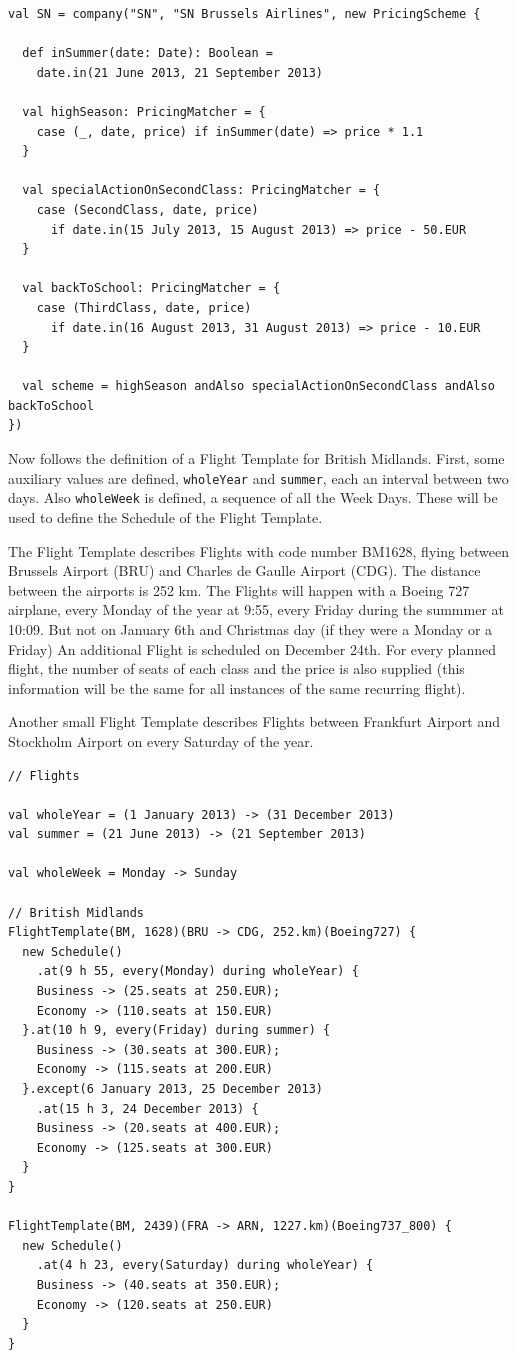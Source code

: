 \documentclass[a4paper]{article}
\renewcommand{\sc}[1]{\lstinline{#1}}
\begin{document}
\begin{lstlisting}
val SN = company("SN", "SN Brussels Airlines", new PricingScheme {

  def inSummer(date: Date): Boolean =
    date.in(21 June 2013, 21 September 2013)

  val highSeason: PricingMatcher = {
    case (_, date, price) if inSummer(date) => price * 1.1
  }

  val specialActionOnSecondClass: PricingMatcher = {
    case (SecondClass, date, price)
      if date.in(15 July 2013, 15 August 2013) => price - 50.EUR
  }

  val backToSchool: PricingMatcher = {
    case (ThirdClass, date, price)
      if date.in(16 August 2013, 31 August 2013) => price - 10.EUR
  }

  val scheme = highSeason andAlso specialActionOnSecondClass andAlso backToSchool
})
\end{lstlisting}

Now follows the definition of a Flight Template for British Midlands.
First, some auxiliary values are defined, \sc{wholeYear} and \sc{summer}, each an interval between two days.
Also \sc{wholeWeek} is defined, a sequence of all the Week Days.
These will be used to define the Schedule of the Flight Template.

The Flight Template describes Flights with code number BM1628, flying between Brussels Airport (BRU) and Charles de Gaulle Airport (CDG).
The distance between the airports is 252 km.
The Flights will happen with a Boeing 727 airplane, every Monday of the year at 9:55, every Friday during the summmer at 10:09.
But not on January 6th and Christmas day (if they were a Monday or a Friday)
An additional Flight is scheduled on December 24th.
For every planned flight, the number of seats of each class and the price is also supplied (this information will be the same for all instances of the same recurring flight).

Another small Flight Template describes Flights between Frankfurt Airport and Stockholm Airport on every Saturday of the year.

\begin{lstlisting}
// Flights

val wholeYear = (1 January 2013) -> (31 December 2013)
val summer = (21 June 2013) -> (21 September 2013)

val wholeWeek = Monday -> Sunday

// British Midlands
FlightTemplate(BM, 1628)(BRU -> CDG, 252.km)(Boeing727) {
  new Schedule()
    .at(9 h 55, every(Monday) during wholeYear) {
    Business -> (25.seats at 250.EUR);
    Economy -> (110.seats at 150.EUR)
  }.at(10 h 9, every(Friday) during summer) {
    Business -> (30.seats at 300.EUR);
    Economy -> (115.seats at 200.EUR)
  }.except(6 January 2013, 25 December 2013)
    .at(15 h 3, 24 December 2013) {
    Business -> (20.seats at 400.EUR);
    Economy -> (125.seats at 300.EUR)
  }
}

FlightTemplate(BM, 2439)(FRA -> ARN, 1227.km)(Boeing737_800) {
  new Schedule()
    .at(4 h 23, every(Saturday) during wholeYear) {
    Business -> (40.seats at 350.EUR);
    Economy -> (120.seats at 250.EUR)
  }
}
\end{lstlisting}
\end{document}
